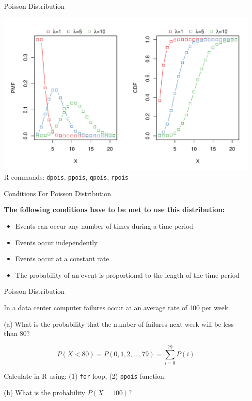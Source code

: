 \begin{frame}{Poisson Distribution}

    \includegraphics[width=\linewidth]{R/plots/poisson-distribution}
    {\tiny R commands: \texttt{dpois}, \texttt{ppois}, \texttt{qpois}, \texttt{rpois}}

\end{frame}

\begin{frame}{Conditions For Poisson Distribution}
\label{}

\textbf{The following conditions have to be met to use this distribution:}
\begin{itemize}
\item Events can occur any number of times during a time period
\item Events occur independently
\item Events occur at a constant rate
\item The probability of an event is proportional to the length of the time period
\end{itemize}

\end{frame}

\begin{frame}{Poisson Distribution}
    \begin{example}
        \medskip
        In a data center computer failures occur at an average rate of 100 per week.
        
        (a) What is the probability that the number of failures next week will be less than 80?
        
        \begin{equation*}
        P(X < 80) = P(0, 1, 2, ..., 79) = \sum_{i=0}^{79} P(i)
        \end{equation*}
        
        Calculate in R using: (1) \texttt{for} loop, (2) \texttt{ppois} function.
        
        (b) What is the probability $P(X = 100)$?
    \end{example}
\end{frame}

